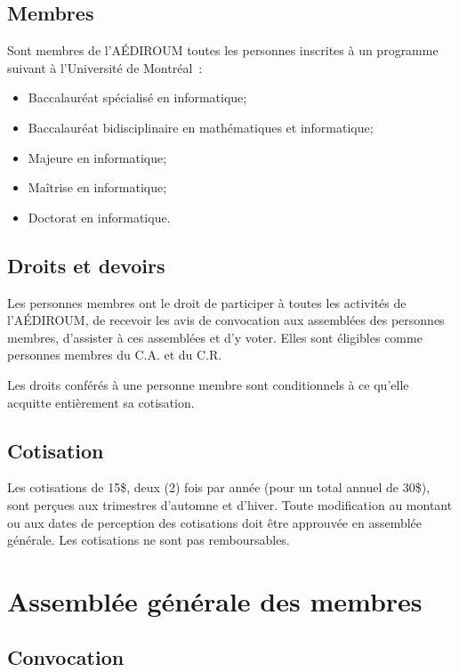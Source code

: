 \documentclass{aediroum}
\begin{document}
\subsection{Membres}\label{sec:membres}
Sont membres de l'AÉDIROUM toutes les personnes inscrites à un programme suivant à l'Université de Montréal~:
\begin{itemize}
\item Baccalauréat spécialisé en informatique;
\item Baccalauréat bidisciplinaire en mathématiques et informatique;
\item Majeure en informatique;
\item Maîtrise en informatique;
\item Doctorat en informatique.
\end{itemize}

\subsection{Droits et devoirs}\label{sec:droits-et-devoirs}

Les personnes membres ont le droit de participer à toutes les activités de l'AÉDIROUM, de recevoir les avis de convocation aux assemblées des personnes membres, d'assister à ces assemblées et d'y voter. Elles sont éligibles comme personnes membres du C.A. et du C.R.

Les droits conférés à une personne membre sont conditionnels à ce qu'elle acquitte entièrement sa cotisation.

\subsection{Cotisation}\label{sec:cotisation}

Les cotisations de 15\$, deux (2) fois par année (pour un total annuel de 30\$), sont perçues aux trimestres d'automne et d'hiver. Toute modification au montant ou aux dates de perception des cotisations doit être approuvée en assemblée générale. Les cotisations ne sont pas remboursables.

\section{Assemblée générale des membres}\label{sec:assemblee-generale-des-membres}
\subsection{Convocation}\label{sec:convocation-generale}
\end{document}
